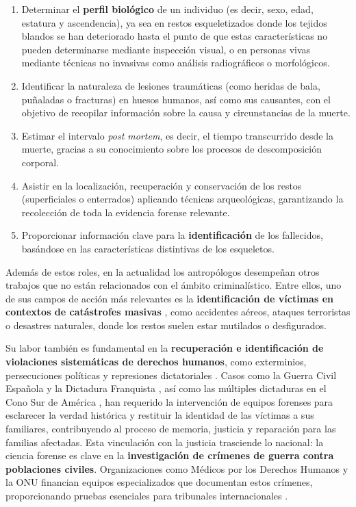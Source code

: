 \begin{enumerate}

    \item Determinar el \textbf{perfil biológico} de un individuo (es decir, sexo, edad, estatura y 
    ascendencia), ya sea en restos esqueletizados donde los tejidos blandos se han deteriorado
    hasta el punto de que estas características no pueden determinarse mediante inspección visual,
    o en personas vivas mediante técnicas no invasivas como análisis radiográficos o morfológicos. 

    \item Identificar la naturaleza de lesiones traumáticas (como heridas de bala, puñaladas o fracturas) en 
    huesos humanos, así como sus causantes, con el objetivo de recopilar información sobre la causa y 
    circunstancias de la muerte.

    \item Estimar el intervalo \textit{post mortem}, es decir, el tiempo transcurrido desde la muerte, gracias 
    a su conocimiento sobre los procesos de descomposición corporal.
    
    \item Asistir en la localización, recuperación y conservación de los restos (superficiales o enterrados) 
    aplicando técnicas arqueológicas, garantizando la recolección de toda la evidencia forense relevante.

    \item Proporcionar información clave para la \textbf{identificación} de los fallecidos, basándose en las 
    características distintivas de los esqueletos.

\end{enumerate}

Además de estos roles, en la actualidad los antropólogos desempeñan otros trabajos que no están relacionados 
con el ámbito criminalístico. Entre ellos, uno de sus campos de acción más relevantes es la 
\textbf{identificación de víctimas en contextos de catástrofes masivas} 
\cite{deBoer2019, prinz2007, beauthier2009}, como accidentes aéreos, ataques terroristas o desastres 
naturales, donde los restos suelen estar mutilados o desfigurados.

Su labor también es fundamental en la \textbf{recuperación e identificación de violaciones sistemáticas de
derechos humanos}, como exterminios, persecuciones políticas y represiones dictatoriales \cite{skinner2003}.
Casos como la Guerra Civil Española y la Dictadura Franquista \cite{sanchisgimeno2024, baeta2015}, así como 
las múltiples dictaduras en el Cono Sur de América \cite{ataliva2024}, han requerido la intervención de 
equipos forenses para esclarecer la verdad histórica y restituir la identidad de las víctimas a sus 
familiares, contribuyendo al proceso de memoria, justicia y reparación para las familias afectadas.
Esta vinculación con la justicia trasciende lo nacional: la ciencia forense es clave en la 
\textbf{investigación de crímenes de guerra contra poblaciones civiles}. Organizaciones como Médicos por los 
Derechos Humanos y la ONU financian equipos especializados que documentan estos crímenes, proporcionando 
pruebas esenciales para tribunales internacionales \cite{tanaka2020}.


